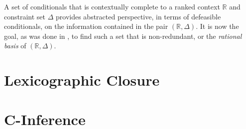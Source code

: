A set of conditionals that is contextually complete to a ranked context $\mathbb{R}$ and constraint set $\Delta$
provides abstracted perspective, in terms of defeasible conditionals, on the information contained in the pair
$(\mathbb{R}, \Delta )$. It is now the goal, as was done in , to find such a set that
is non-redundant, or the \textit{rational basis} of $(\mathbb{R},\Delta)$.

\section{Lexicographic Closure}


\section{C-Inference}
